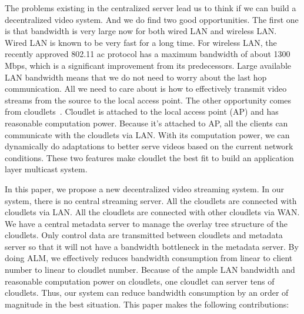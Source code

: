 \documentclass[letterpaper,twocolumn,10pt]{article}
\begin{document}
The problems existing in the centralized server lead us to think if we can build a decentralized video system. And we do find two good opportunities. The first one is that bandwidth is very large now for both wired LAN and wireless LAN. Wired LAN is known to be very fast for a long time. For wireless LAN, the recently approved 802.11 ac protocol has a maximum bandwidth of about 1300 Mbps, which is a significant improvement from its predecessors. Large available LAN bandwidth means that we do not need to worry about the last hop communication. All we need to care about is how to effectively transmit video streams from the source to the local access point. The other opportunity comes from cloudlets~\cite{simoens2013scalable}. Cloudlet is attached to the local access point (AP) and has reasonable computation power. Because it's attached to AP, all the clients can communicate with the cloudlets via LAN. With its computation power, we can dynamically do adaptations to better serve videos based on the current network conditions. These two features make cloudlet the best fit to build an application layer multicast system.

In this paper, we propose a new decentralized video streaming system. In our system, there is no central streaming server. All the cloudlets are connected with cloudlets via LAN. All the cloudlets are connected with other cloudlets via WAN. We have a central metadata server to manage the overlay tree structure of the cloudlets. Only control data are transmitted between cloudlets and metadata server so that it will not have a bandwidth bottleneck in the metadata server. By doing ALM, we effectively reduces bandwidth consumption from linear to client number to linear to cloudlet number. Because of the ample LAN bandwidth and reasonable computation power on cloudlets, one cloudlet can server tens of cloudlets. Thus, our system can reduce bandwidth consumption by an order of magnitude in the best situation. This paper makes the following contributions:
\end{document}
